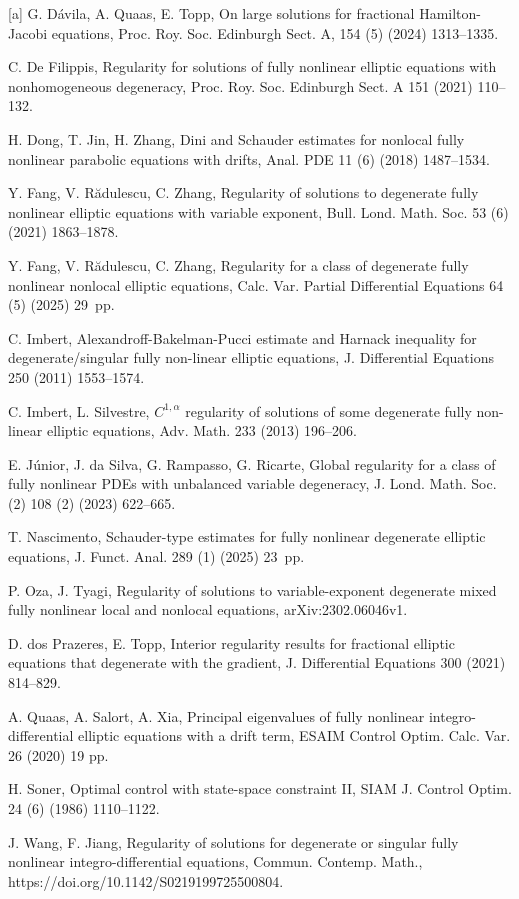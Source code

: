 \documentclass[11pt,reqno]{amsart}
\numberwithin{equation}{section}
\begin{document}
\begin{thebibliography}{[a]}
 G. D\'{a}vila, A. Quaas, E. Topp, On large solutions for fractional Hamilton-Jacobi equations, Proc. Roy. Soc. Edinburgh Sect. A, 154 (5) (2024) 1313--1335.
    

 C. De Filippis, Regularity for solutions of fully nonlinear elliptic equations with nonhomogeneous degeneracy, Proc. Roy. Soc. Edinburgh Sect. A 151 (2021) 110--132.


 H. Dong, T. Jin, H. Zhang, Dini and Schauder estimates for nonlocal fully nonlinear parabolic equations with drifts, Anal. PDE 11 (6) (2018) 1487--1534.

 Y. Fang, V. R\u{a}dulescu, C. Zhang, Regularity of solutions to degenerate fully nonlinear elliptic equations with variable exponent, Bull. Lond. Math. Soc. 53 (6) (2021) 1863--1878.

 Y. Fang, V. R\u{a}dulescu, C. Zhang, Regularity for a class of degenerate fully nonlinear nonlocal elliptic equations, Calc. Var. Partial Differential Equations 64 (5) (2025) 29~pp.

 C. Imbert, Alexandroff-Bakelman-Pucci estimate and Harnack inequality for degenerate/singular fully non-linear elliptic equations, J. Differential Equations 250 (2011) 1553--1574.

 C. Imbert, L. Silvestre, $C^{1,\alpha}$ regularity of solutions of some degenerate fully non-linear elliptic equations, Adv. Math. 233 (2013) 196--206.

 E. J\'{u}nior, J. da Silva, G. Rampasso, G. Ricarte, Global regularity for a class of fully nonlinear PDEs with unbalanced variable degeneracy, J. Lond. Math. Soc. (2) 108 (2) (2023) 622--665.

 T. Nascimento, Schauder-type estimates for fully nonlinear degenerate elliptic equations, J. Funct. Anal. 289 (1) (2025) 23~pp.

 P. Oza, J. Tyagi, Regularity of solutions to variable-exponent degenerate mixed fully nonlinear local and nonlocal equations, arXiv:2302.06046v1.

 D. dos Prazeres, E. Topp, Interior regularity results for fractional elliptic equations that degenerate with the gradient, J. Differential Equations 300 (2021) 814--829.

 A. Quaas, A. Salort, A. Xia, Principal eigenvalues of fully nonlinear integro-differential elliptic equations with a drift term, ESAIM Control Optim. Calc. Var. 26 (2020) 19 pp.

 H. Soner, Optimal control with state-space constraint II, SIAM J. Control Optim. 24 (6) (1986) 1110--1122.

 J. Wang, F. Jiang, Regularity of solutions for degenerate or singular fully nonlinear integro-differential equations, Commun. Contemp. Math., https://doi.org/10.1142/S0219199725500804.
\end{thebibliography}
\end{document}
